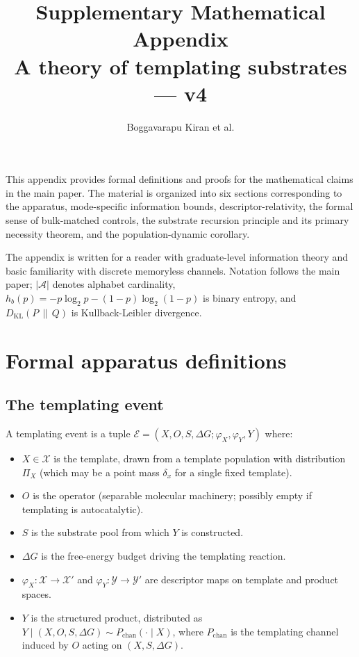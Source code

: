 \documentclass[11pt]{article}
\title{Supplementary Mathematical Appendix\\
\large A theory of templating substrates --- v4}
\author{Boggavarapu Kiran et al.}
\date{}
\theoremstyle{plain}
\theoremstyle{definition}
\newcommand{\Hbin}{h_b}
\newcommand{\descX}{\varphi_X}
\newcommand{\descY}{\varphi_Y}
\newcommand{\KL}[2]{D_{\mathrm{KL}}\!\left(#1 \,\|\, #2\right)}
\begin{document}
\maketitle

\noindent
This appendix provides formal definitions and proofs for the mathematical claims in the main paper. The material is organized into six sections corresponding to the apparatus, mode-specific information bounds, descriptor-relativity, the formal sense of bulk-matched controls, the substrate recursion principle and its primary necessity theorem, and the population-dynamic corollary.

The appendix is written for a reader with graduate-level information theory \citep{CoverThomas2006} and basic familiarity with discrete memoryless channels. Notation follows the main paper; $|\mathcal{A}|$ denotes alphabet cardinality, $\Hbin(p) = -p \log_2 p - (1-p) \log_2 (1-p)$ is binary entropy, and $\KL{P}{Q}$ is Kullback-Leibler divergence.

\tableofcontents
\bigskip

\section{Formal apparatus definitions}

\subsection{The templating event}

A templating event is a tuple $\mathcal{E} = (X, O, S, \Delta G; \descX, \descY, Y)$ where:
\begin{itemize}
  \item $X \in \mathcal{X}$ is the template, drawn from a template population with distribution $\Pi_X$ (which may be a point mass $\delta_x$ for a single fixed template).
  \item $O$ is the operator (separable molecular machinery; possibly empty if templating is autocatalytic).
  \item $S$ is the substrate pool from which $Y$ is constructed.
  \item $\Delta G$ is the free-energy budget driving the templating reaction.
  \item $\descX: \mathcal{X} \to \mathcal{X}'$ and $\descY: \mathcal{Y} \to \mathcal{Y}'$ are descriptor maps on template and product spaces.
  \item $Y$ is the structured product, distributed as $Y \mid (X, O, S, \Delta G) \sim P_{\mathrm{chan}}(\cdot \mid X)$, where $P_{\mathrm{chan}}$ is the templating channel induced by $O$ acting on $(X, S, \Delta G)$.
\end{itemize}
\end{document}
